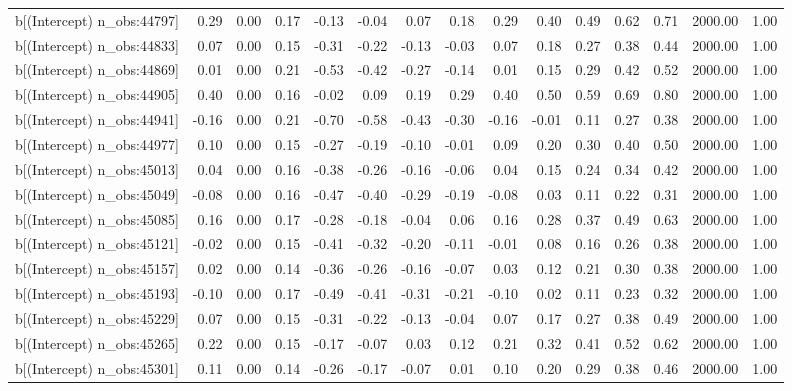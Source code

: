 \begin{table}[ht]
\begin{tabular}{rrrrrrrrrrrrrrr}
  b[(Intercept) n\_obs:44797] & 0.29 & 0.00 & 0.17 & -0.13 & -0.04 & 0.07 & 0.18 & 0.29 & 0.40 & 0.49 & 0.62 & 0.71 & 2000.00 & 1.00 \\ 
  b[(Intercept) n\_obs:44833] & 0.07 & 0.00 & 0.15 & -0.31 & -0.22 & -0.13 & -0.03 & 0.07 & 0.18 & 0.27 & 0.38 & 0.44 & 2000.00 & 1.00 \\ 
  b[(Intercept) n\_obs:44869] & 0.01 & 0.00 & 0.21 & -0.53 & -0.42 & -0.27 & -0.14 & 0.01 & 0.15 & 0.29 & 0.42 & 0.52 & 2000.00 & 1.00 \\ 
  b[(Intercept) n\_obs:44905] & 0.40 & 0.00 & 0.16 & -0.02 & 0.09 & 0.19 & 0.29 & 0.40 & 0.50 & 0.59 & 0.69 & 0.80 & 2000.00 & 1.00 \\ 
  b[(Intercept) n\_obs:44941] & -0.16 & 0.00 & 0.21 & -0.70 & -0.58 & -0.43 & -0.30 & -0.16 & -0.01 & 0.11 & 0.27 & 0.38 & 2000.00 & 1.00 \\ 
  b[(Intercept) n\_obs:44977] & 0.10 & 0.00 & 0.15 & -0.27 & -0.19 & -0.10 & -0.01 & 0.09 & 0.20 & 0.30 & 0.40 & 0.50 & 2000.00 & 1.00 \\ 
  b[(Intercept) n\_obs:45013] & 0.04 & 0.00 & 0.16 & -0.38 & -0.26 & -0.16 & -0.06 & 0.04 & 0.15 & 0.24 & 0.34 & 0.42 & 2000.00 & 1.00 \\ 
  b[(Intercept) n\_obs:45049] & -0.08 & 0.00 & 0.16 & -0.47 & -0.40 & -0.29 & -0.19 & -0.08 & 0.03 & 0.11 & 0.22 & 0.31 & 2000.00 & 1.00 \\ 
  b[(Intercept) n\_obs:45085] & 0.16 & 0.00 & 0.17 & -0.28 & -0.18 & -0.04 & 0.06 & 0.16 & 0.28 & 0.37 & 0.49 & 0.63 & 2000.00 & 1.00 \\ 
  b[(Intercept) n\_obs:45121] & -0.02 & 0.00 & 0.15 & -0.41 & -0.32 & -0.20 & -0.11 & -0.01 & 0.08 & 0.16 & 0.26 & 0.38 & 2000.00 & 1.00 \\ 
  b[(Intercept) n\_obs:45157] & 0.02 & 0.00 & 0.14 & -0.36 & -0.26 & -0.16 & -0.07 & 0.03 & 0.12 & 0.21 & 0.30 & 0.38 & 2000.00 & 1.00 \\ 
  b[(Intercept) n\_obs:45193] & -0.10 & 0.00 & 0.17 & -0.49 & -0.41 & -0.31 & -0.21 & -0.10 & 0.02 & 0.11 & 0.23 & 0.32 & 2000.00 & 1.00 \\ 
  b[(Intercept) n\_obs:45229] & 0.07 & 0.00 & 0.15 & -0.31 & -0.22 & -0.13 & -0.04 & 0.07 & 0.17 & 0.27 & 0.38 & 0.49 & 2000.00 & 1.00 \\ 
  b[(Intercept) n\_obs:45265] & 0.22 & 0.00 & 0.15 & -0.17 & -0.07 & 0.03 & 0.12 & 0.21 & 0.32 & 0.41 & 0.52 & 0.62 & 2000.00 & 1.00 \\ 
  b[(Intercept) n\_obs:45301] & 0.11 & 0.00 & 0.14 & -0.26 & -0.17 & -0.07 & 0.01 & 0.10 & 0.20 & 0.29 & 0.38 & 0.46 & 2000.00 & 1.00 \\ 

\end{tabular}
\end{table}
